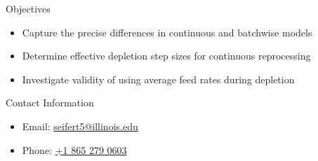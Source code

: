 \documentclass[final]{beamer}
\newlength{\onecolwid}
\newlength{\threecolwid}
\begin{document}
\begin{frame}[t]
\begin{columns}[t,totalwidth=\threecolwid]
\begin{column}{\onecolwid}
\begin{alertblock}{Objectives}
\begin{itemize}
        \item Capture the precise differences in continuous and batchwise models
	\item Determine effective depletion step sizes for continuous reprocessing
	\item Investigate validity of using average feed rates during depletion
\end{itemize}

\end{alertblock}




\begin{alertblock}{Contact Information}
	\begin{itemize}
		\item Email: \href{mailto:seifert5@illinois.edu}{seifert5@illinois.edu}
		\item Phone: \href{tel:18652790603}{+1 865 279 0603}
	\end{itemize}
	
\end{alertblock}






%
%
%
%
% 
%
%


\end{column}
\end{columns}
\end{frame}
\end{document}
